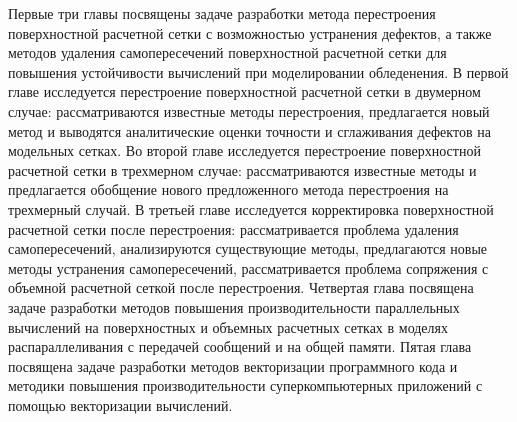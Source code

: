 Первые три главы посвящены задаче разработки метода перестроения поверхностной расчетной сетки с возможностью устранения дефектов, а также методов удаления самопересечений поверхностной расчетной сетки для повышения устойчивости вычислений при моделировании обледенения.
В первой главе исследуется перестроение поверхностной расчетной сетки в двумерном случае: рассматриваются известные методы перестроения, предлагается новый метод и выводятся аналитические оценки точности и сглаживания дефектов на модельных сетках.
Во второй главе исследуется перестроение поверхностной расчетной сетки в трехмерном случае: рассматриваются известные методы и предлагается обобщение нового предложенного метода перестроения на трехмерный случай.
В третьей главе исследуется корректировка поверхностной расчетной сетки после перестроения: рассматривается проблема удаления самопересечений, анализируются существующие методы, предлагаются новые методы устранения самопересечений, рассматривается проблема сопряжения с объемной расчетной сеткой после перестроения.
Четвертая глава посвящена задаче разработки методов повышения производительности параллельных вычислений на поверхностных и объемных расчетных сетках в моделях распараллеливания с передачей сообщений и на общей памяти.
Пятая глава посвящена задаче разработки методов векторизации программного кода и методики повышения производительности суперкомпьютерных приложений с помощью векторизации вычислений.